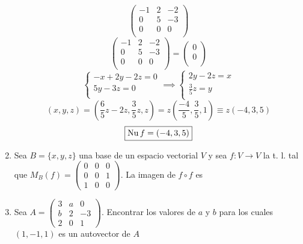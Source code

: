 \documentclass[../practica.root.tex]{subfiles}
\begin{document}
\begin{enumerate}
\[              \begin{pmatrix}
                  -1 & 2 & -2 \\
                  0  & 5 & -3 \\
                  0  & 0 & 0  \\
              \end{pmatrix}
          \] \[
              \begin{pmatrix}
                  -1 & 2 & -2 \\
                  0  & 5 & -3 \\
                  0  & 0 & 0  \\
              \end{pmatrix} = \begin{pmatrix}
                  0 \\ 0 \\
              \end{pmatrix}
          \] \[
              \begin{cases}
                  -x + 2y - 2z = 0 \\
                  5y - 3z = 0      \\
              \end{cases}
              \implies
              \begin{cases}
                  2y - 2z = x      \\
                  \frac{3}{5}z = y \\
              \end{cases}
          \] \[
              (x,y,z) = \left(\frac{6}{5}z - 2z, \frac{3}{5}z, z\right) = z\left(\frac{-4}{5}, \frac{3}{5}, 1\right) \equiv z(-4,3,5)
          \] \[
              \boxed{\operatorname{Nu} f = (-4,3,5)}
          \]

    \item Sea $B = \{x,y,z\}$ una base de un espacio vectorial $V$ y sea $f : V \to V$ la t. l. tal que $M_B(f) = \begin{pmatrix}
                  0 & 0 & 0 \\ 0 & 0 & 1 \\ 1 & 0 & 0
              \end{pmatrix}$. La imagen de $f \circ f$ es

    \item Sea $A = \begin{pmatrix}
                  3 & a & 0 \\ b & 2 & -3 \\ 2 & 0 & 1
              \end{pmatrix}$. Encontrar los valores de $a$ y $b$ para los cuales $(1,-1,1)$ es un autovector de $A$


\end{enumerate}
\end{document}
